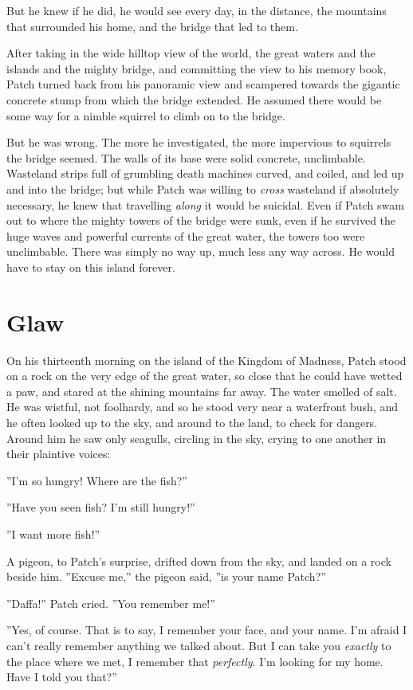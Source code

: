 \documentclass[12pt]{book}
\begin{document}
But he knew if he did, he would see every day, in the distance, the mountains that surrounded his home, and the bridge that led to them.

After taking in the wide hilltop view of the world, the great waters and the islands and the mighty bridge, and committing the view to his memory book, Patch turned back from his panoramic view and scampered towards the gigantic concrete stump from which the bridge extended. He assumed there would be some way for a nimble squirrel to climb on to the bridge.

But he was wrong. The more he investigated, the more impervious to squirrels the bridge seemed. The walls of its base were solid concrete, unclimbable. Wasteland strips full of grumbling death machines curved, and coiled, and led up and into the bridge; but while Patch was willing to {\it cross} wasteland if absolutely necessary, he knew that travelling {\it along} it would be suicidal. Even if Patch swam out to where the mighty towers of the bridge were sunk, even if he survived the huge waves and powerful currents of the great water, the towers too were unclimbable. There was simply no way up, much less any way across. He would have to stay on this island forever.


\section{Glaw}

On his thirteenth morning on the island of the Kingdom of Madness, Patch stood on a rock on the very edge of the great water, so close that he could have wetted a paw, and stared at the shining mountains far away. The water smelled of salt. He was wistful, not foolhardy, and so he stood very near a waterfront bush, and he often looked up to the sky, and around to the land, to check for dangers. Around him he saw only seagulls, circling in the sky, crying to one another in their plaintive voices:

''I'm so hungry! Where are the fish?''

''Have you seen fish? I'm still hungry!''

''I want more fish!''

A pigeon, to Patch's surprise, drifted down from the sky, and landed on a rock beside him. ''Excuse me,'' the pigeon said, ''is your name Patch?''

''Daffa!'' Patch cried. ''You remember me!''

''Yes, of course. That is to say, I remember your face, and your name. I'm afraid I can't really remember anything we talked about. But I can take you {\it exactly} to the place where we met, I remember that {\it perfectly}. I'm looking for my home. Have I told you that?''
\end{document}
